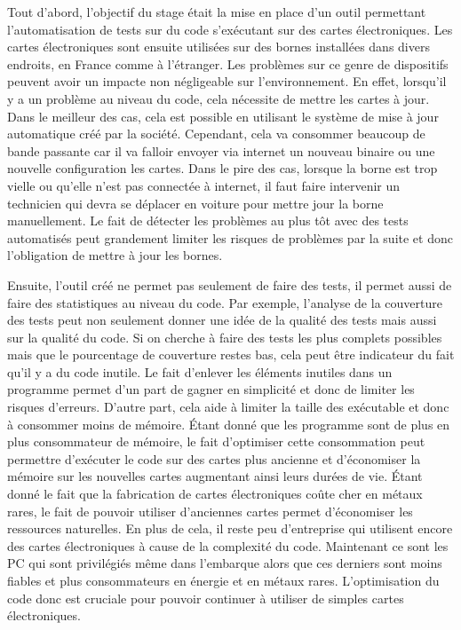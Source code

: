 \documentclass[a4paper]{article}
\begin{document}
Tout d'abord, l'objectif du stage était la mise en place d'un outil permettant
l'automatisation de tests sur du code s'exécutant sur des cartes électroniques.
Les cartes électroniques sont ensuite utilisées sur des bornes installées dans
divers endroits, en France comme à l'étranger. Les problèmes sur ce genre de
dispositifs peuvent avoir un impacte non négligeable sur l'environnement. En
effet, lorsqu'il y a un problème au niveau du code, cela nécessite de mettre
les cartes à jour. Dans le meilleur des cas, cela est possible en utilisant le
système de mise à jour automatique créé par la société. Cependant, cela va
consommer beaucoup de bande passante car il va falloir envoyer via internet un
nouveau binaire ou une nouvelle configuration les cartes. Dans le pire des cas,
lorsque la borne est trop vielle ou qu'elle n'est pas connectée à internet, il
faut faire intervenir un technicien qui devra se déplacer en voiture pour mettre
jour la borne manuellement. Le fait de détecter les problèmes au plus tôt avec
des tests automatisés peut grandement limiter les risques de problèmes par la
suite et donc l'obligation de mettre à jour les bornes.

Ensuite, l'outil créé ne permet pas seulement de faire des tests, il permet
aussi de faire des statistiques au niveau du code. Par exemple, l'analyse de la
couverture des tests peut non seulement donner une idée de la qualité des tests
mais aussi sur la qualité du code. Si on cherche à faire des tests les plus
complets possibles mais que le pourcentage de couverture restes bas, cela peut
être indicateur du fait qu'il y a du code inutile. Le fait d'enlever les
éléments inutiles dans un programme permet d'un part de gagner en simplicité et
donc de limiter les risques d'erreurs. D'autre part, cela aide à limiter la
taille des exécutable et donc à consommer moins de mémoire. Étant donné que les
programme sont de plus en plus consommateur de mémoire, le fait d'optimiser
cette consommation peut permettre d'exécuter le code sur des cartes plus
ancienne et d'économiser la mémoire sur les nouvelles cartes augmentant ainsi
leurs durées de vie. Étant donné le fait que la fabrication de cartes
électroniques coûte cher en métaux rares, le fait de pouvoir utiliser
d'anciennes cartes permet d'économiser les ressources naturelles. En plus de
cela, il reste peu d'entreprise qui utilisent encore des cartes électroniques à
cause de la complexité du code. Maintenant ce sont les PC qui sont privilégiés
même dans l'embarque alors que ces derniers sont moins fiables et plus
consommateurs en énergie et en métaux rares. L'optimisation du code donc est
cruciale pour pouvoir continuer à utiliser de simples cartes électroniques.
\end{document}
